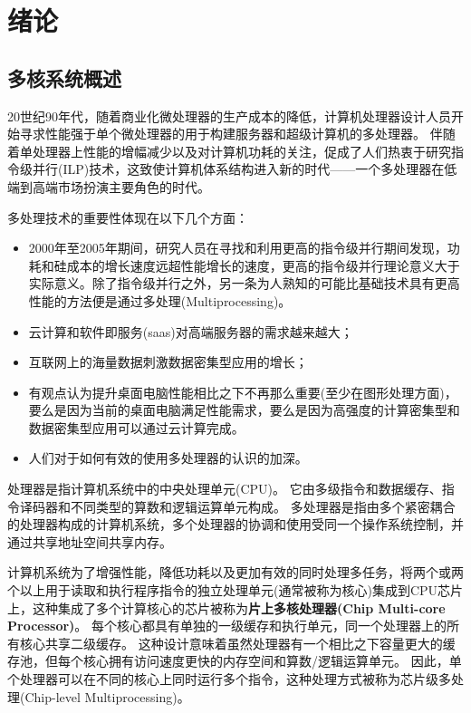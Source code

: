 \chapter{绪\quad 论}

\section{多核系统概述}
20世纪90年代，随着商业化微处理器的生产成本的降低，计算机处理器设计人员开始寻求性能强于单个微处理器的用于构建服务器和超级计算机的多处理器。
伴随着单处理器上性能的增幅减少以及对计算机功耗的关注，促成了人们热衷于研究指令级并行(ILP)技术，这致使计算机体系结构进入新的时代——一个多处理器在低端到高端市场扮演主要角色的时代。

多处理技术的重要性体现在以下几个方面：
\begin{itemize}
	\item 2000年至2005年期间，研究人员在寻找和利用更高的指令级并行期间发现，功耗和硅成本的增长速度远超性能增长的速度，更高的指令级并行理论意义大于实际意义。除了指令级并行之外，另一条为人熟知的可能比基础技术具有更高性能的方法便是通过多处理(Multiprocessing)。
	\item 云计算和软件即服务(saas)对高端服务器的需求越来越大；
	\item 互联网上的海量数据刺激数据密集型应用的增长；
	\item 有观点认为提升桌面电脑性能相比之下不再那么重要(至少在图形处理方面)，要么是因为当前的桌面电脑满足性能需求，要么是因为高强度的计算密集型和数据密集型应用可以通过云计算完成。
	\item 人们对于如何有效的使用多处理器的认识的加深。
\end{itemize}

处理器是指计算机系统中的中央处理单元(CPU)。
它由多级指令和数据缓存、指令译码器和不同类型的算数和逻辑运算单元构成。
多处理器是指由多个紧密耦合的处理器构成的计算机系统，多个处理器的协调和使用受同一个操作系统控制，并通过共享地址空间共享内存\cite{hennessy2011computer}。

计算机系统为了增强性能，降低功耗以及更加有效的同时处理多任务，将两个或两个以上用于读取和执行程序指令的独立处理单元(通常被称为核心)集成到CPU芯片上，这种集成了多个计算核心的芯片被称为\textbf{片上多核处理器(Chip Multi-core Processor)}\cite{geer2005chip}。
每个核心都具有单独的一级缓存和执行单元，同一个处理器上的所有核心共享二级缓存。
这种设计意味着虽然处理器有一个相比之下容量更大的缓存池，但每个核心拥有访问速度更快的内存空间和算数/逻辑运算单元。
因此，单个处理器可以在不同的核心上同时运行多个指令，这种处理方式被称为芯片级多处理(Chip-level Multiprocessing)。

